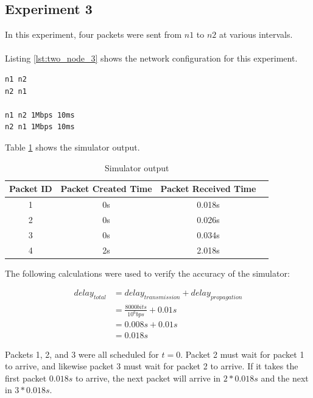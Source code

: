 \documentclass[fleqn,11pt]{article}
\begin{document}
\subsection{Experiment 3}
\vspace{0.5cm}

In this experiment, four packets were sent from $n1$ to $n2$ at various intervals.\\\\
Listing \ref{lst:two_node_3} shows the network configuration for this experiment.

\vspace{0.5cm}
\begin{lstlisting}[caption={Network configuration},label={lst:two_node_3}]
n1 n2
n2 n1

n1 n2 1Mbps 10ms
n2 n1 1Mbps 10ms
\end{lstlisting}
\vspace{0.5cm}

\vspace{2.5cm}
\noindent
Table \ref{tab:two_node_3} shows the simulator output.

\begin{table}[h]
  \caption{Simulator output}
  \label{tab:two_node_3}
  \begin{center}
    \begin{tabular}{cccc}
      \toprule
      Packet ID & Packet Created Time & Packet Received Time & \\
      \midrule
      1 & 0s & 0.018s\\
      2 & 0s & 0.026s\\
      3 & 0s & 0.034s\\
      4 & 2s & 2.018s\\
      \bottomrule
    \end{tabular}
  \end{center}
\end{table}
\vspace{0.5cm}

\noindent
The following calculations were used to verify the accuracy of the simulator:

\begin{align*}
  delay_{total} &= delay_{transmission} + delay_{propagation}\\
  &= \frac{8000bits}{10^6bps} + 0.01s\\
  &= 0.008s + 0.01s\\
  &= 0.018s
\end{align*}

\noindent
Packets 1, 2, and 3 were all scheduled for $t=0$. Packet 2 must wait for
packet 1 to arrive, and likewise packet 3 must wait for packet 2 to arrive. If
it takes the first packet $0.018s$ to arrive, the next packet will arrive in $2
* 0.018s$ and the next in $3 * 0.018s$.\\
\end{document}
